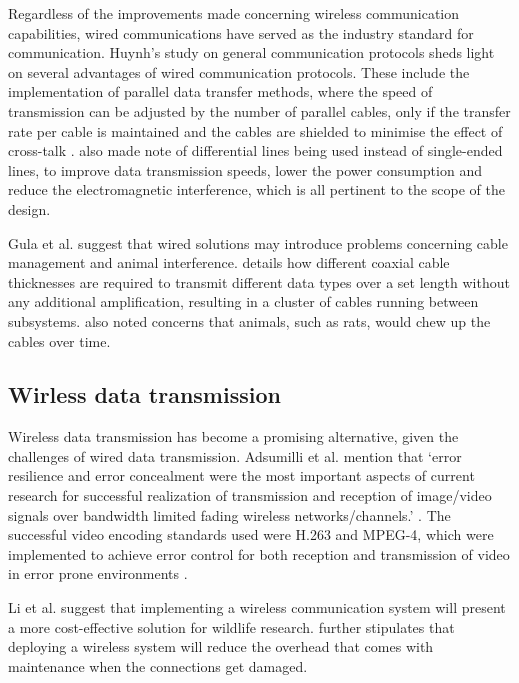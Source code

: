 \documentclass[class=report,11pt,crop=false]{standalone}
\begin{document}
Regardless of the improvements made concerning wireless communication capabilities, wired communications have served as the industry standard for communication. Huynh’s study on general communication protocols \cite{huynh2010study} sheds light on several advantages of wired communication protocols. These include the implementation of parallel data transfer methods, where the speed of transmission can be adjusted by the number of parallel cables, only if the transfer rate per cable is maintained and the cables are shielded to minimise the effect of cross-talk \cite{huynh2010study}. \cite{huynh2010study} also made note of differential lines being used instead of single-ended lines, to improve data transmission speeds, lower the power consumption and reduce the electromagnetic interference, which is all pertinent to the scope of the design.

Gula et al. \cite{gula2010audio} suggest that wired solutions may introduce problems concerning cable management and animal interference. \cite{gula2010audio} details how different coaxial cable thicknesses are required to transmit different data types over a set length without any additional amplification, resulting in a cluster of cables running between subsystems. \cite{gula2010audio} also noted concerns that animals, such as rats, would chew up the cables over time. 

\subsection{Wirless data transmission}


Wireless data transmission has become a promising alternative, given the challenges of wired data transmission. Adsumilli et al. mention that ‘error resilience and error concealment were the most important aspects of current research for successful realization of transmission and reception of image/video signals over bandwidth limited fading wireless networks/channels.’ \cite{adsumilli2002adaptive}. The successful video encoding standards used were H.263 and MPEG-4, which were implemented to achieve error control for both reception and transmission of video in error prone environments \cite{adsumilli2002adaptive}. 

Li et al. \cite{li2010design} suggest that implementing a wireless communication system will present a more cost-effective solution for wildlife research.  \cite{li2010design} further stipulates that deploying a wireless system will reduce the overhead that comes with maintenance when the connections get damaged.
\end{document}
